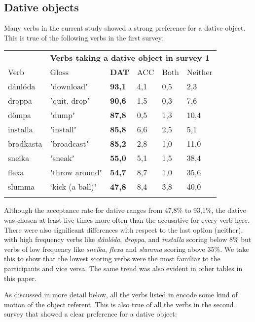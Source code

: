 \documentclass[output=paper,modfonts,nonflat]{langsci/langscibook}
\begin{document}
\subsection{Dative objects} %

Many verbs in the current study showed a strong preference for a dative object. This is true of the following verbs in the first survey: 

\tablefirsthead{}

\tabletail{}
\tablelasttail{}
\begin{tabularx}{\textwidth}{XXXXXX}
\lsptoprule

\multicolumn{1}{X}{{\bfseries \tabref{tab:key:1}:}} & \multicolumn{5}{X}{{\bfseries Verbs taking a dative object in survey 1}}\\
Verb & Gloss & \textbf{DAT} & ACC & Both & Neither\\
dánlóda & ʽdownloadʼ & \textbf{93,1} & 4,1 & 0,5 & 2,3\\
droppa & ʽquit, dropʼ & \textbf{90,6} & 1,5 & 0,3 & 7,6\\
dömpa & ʽdumpʼ & \textbf{87,8} & 0,5 & 1,3 & 10,4\\
installa & ʽinstallʼ & \textbf{85,8} & 6,6 & 2,5 & 5,1\\
brodkasta & ʽbroadcastʼ & \textbf{85,2} & 2,8 & 1,0 & 11,0\\
sneika & ʽsneakʼ & \textbf{55,0} & 5,1 & 1,5 & 38,4\\
flexa & ʽthrow aroundʼ & \textbf{54,7} & 8,7 & 1,0 & 35,6\\
slumma & ‘kick (a ball)’ & \textbf{47,8} & 8,4 & 3,8 & 40,0\\
\lspbottomrule
\end{tabularx}
Although the acceptance rate for dative ranges from 47,8\% to 93,1\%, the dative was chosen at least five times more often than the accusative for every verb here. There were also significant differences with respect to the last option (neither), with high frequency verbs like \textit{dánlóda}, \textit{droppa}, and \textit{installa} scoring below 8\% but verbs of low frequency like \textit{sneika}, \textit{flexa} and \textit{slumma} scoring above 35\%. We take this to show that the lowest scoring verbs were the most familiar to the participants and vice versa. The same trend was also evident in other tables in this paper.

As discussed in more detail below, all the verbs listed in  encode some kind of motion of the object referent. This is also true of all the verbs in the second survey that showed a clear preference for a dative object:
\end{document}
